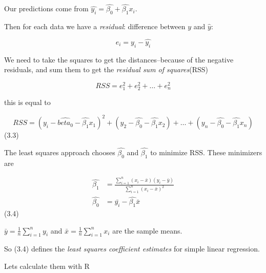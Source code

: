 \documentclass[
  letterpaper,
  DIV=11,
  numbers=noendperiod]{scrreprt}
\newenvironment{Shaded}{\begin{snugshade}}{\end{snugshade}}
\newcommand{\DecValTok}[1]{\textcolor[rgb]{0.68,0.00,0.00}{#1}}
\newcommand{\FunctionTok}[1]{\textcolor[rgb]{0.28,0.35,0.67}{#1}}
\newcommand{\NormalTok}[1]{\textcolor[rgb]{0.00,0.23,0.31}{#1}}
\newcommand{\OtherTok}[1]{\textcolor[rgb]{0.00,0.23,0.31}{#1}}
\newcommand{\SpecialCharTok}[1]{\textcolor[rgb]{0.37,0.37,0.37}{#1}}
\begin{document}
Our predictions come from
\(\hat{y_i} = \hat{\beta_0} + \hat{\beta_1}x_i\).

Then for each data we have a \emph{residual}: difference between \(y\)
and \(\hat{y}\):

\[
e_i = y_i - \hat{y_i}
\]

We need to take the squares to get the distances--because of the
negative residuals, and sum them to get the \emph{residual sum of
squares}(RSS)

\[
RSS = e_1^2 + e_2^2 + \dots + e_n^2
\]

this is equal to

\[
RSS = (y_i - \hat{beta_0} - \hat{\beta_1}x_1)^2 + (y_2 - \hat{\beta_0} - \hat{\beta_1}x_2) + \dots + (y_n - \hat{\beta_0} - \hat{\beta_1}x_n)
\] (3.3)

The least squares approach chooses \(\hat{\beta_0}\) and
\(\hat{\beta_1}\) to minimize RSS. These minimizers are

\[
\begin{align}
\hat{\beta_1} &= \frac{\sum_{i=1}^n(x_i - \bar{x})(y_i - \bar{y})}{\sum_{i=1}^n(x_i - \bar{x})^2} \\
\hat{\beta_0} &= \bar{y_i} - \hat{\beta_1}\bar{x}
\end{align}
\] (3.4)

\(\bar{y} = \frac{1}{n}\sum_{i=1}^ny_i\) and
\(\bar{x} = \frac{1}{n}\sum_{i=1}^nx_i\) are the sample means.

So (3.4) defines the \emph{least squares coefficient estimates} for
simple linear regression.

Lets calculate them with R

\begin{Shaded}
\end{Shaded}
\end{document}
